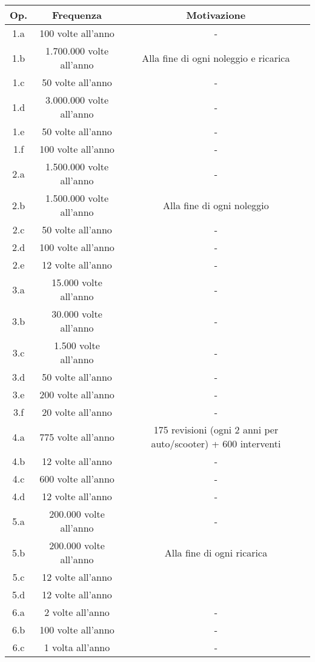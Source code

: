 \documentclass{article}
\begin{document}
\begin{table}[H]
    \centering
    \begin{tabular}{|c|c|c|}
        \hline
        Op. & Frequenza & Motivazione \\
        \hline
        1.a & 100 volte all'anno & - \\
        1.b & 1.700.000 volte all'anno & Alla fine di ogni noleggio e ricarica \\
        1.c & 50 volte all'anno & - \\
        1.d & 3.000.000 volte all'anno & - \\
        1.e & 50 volte all'anno & - \\
        1.f & 100 volte all'anno & - \\
        2.a & 1.500.000 volte all'anno & - \\
        2.b & 1.500.000 volte all'anno & Alla fine di ogni noleggio \\
        2.c & 50 volte all'anno & - \\
        2.d & 100 volte all'anno & - \\
        2.e & 12 volte all'anno & - \\
        3.a & 15.000 volte all'anno & - \\
        3.b & 30.000 volte all'anno & - \\
        3.c & 1.500 volte all'anno & - \\
        3.d & 50 volte all'anno & - \\
        3.e & 200 volte all'anno & - \\
        3.f & 20 volte all'anno & - \\
        4.a & 775 volte all'anno & 175 revisioni (ogni 2 anni per auto/scooter) + 600 interventi \\
        4.b & 12 volte all'anno & - \\
        4.c & 600 volte all'anno  & - \\
        4.d & 12 volte all'anno & - \\
        5.a & 200.000 volte all'anno & - \\
        5.b & 200.000 volte all'anno & Alla fine di ogni ricarica \\
        5.c & 12 volte all'anno &  \\
        5.d & 12 volte all'anno &  \\
        6.a & 2 volte all'anno & - \\
        6.b & 100 volte all'anno & - \\
        6.c & 1 volta all'anno & - \\

\end{tabular}
\end{table}
\end{document}
